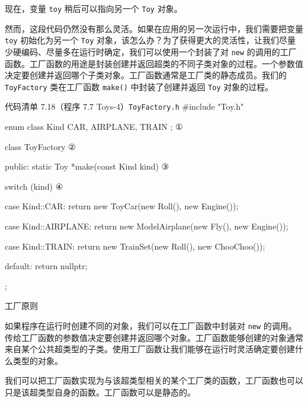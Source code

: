 现在，变量 \texttt{toy} 稍后可以指向另一个 \texttt{Toy} 对象。

然而，这段代码仍然没有那么灵活。如果在应用的另一次运行中，我们需要把变量 \texttt{toy} 初始化为另一个 \texttt{Toy} 对象，该怎么办？为了获得更大的灵活性，让我们尽量少硬编码、尽量多在运行时确定，我们可以使用一个封装了对 \texttt{new} 的调用的工厂函数。工厂函数的用途是封装创建并返回超类的不同子类对象的过程。一个参数值决定要创建并返回哪个子类对象。工厂函数通常是工厂类的静态成员。我们的 \texttt{Toy\allowbreak{}Factory} 类在工厂函数 \texttt{make()} 中封装了创建并返回 \texttt{Toy} 对象的过程。

\begin{codeboxt}{代码清单 7.18（程序 7.7 Toys-4）\texttt{Toy\allowbreak{}Factory.\allowbreak{}h}}
#include "Toy.h"

enum class Kind { CAR, AIRPLANE, TRAIN };  ①

class ToyFactory                           ②
{
public:
    static Toy *make(const Kind kind)      ③
    {
        switch (kind)                      ④
        {
            case Kind::CAR:
                return new ToyCar(new Roll(), new Engine());

            case Kind::AIRPLANE:
                return new ModelAirplane(new Fly(), new Engine());

            case Kind::TRAIN:
                return new TrainSet(new Roll(), new ChooChoo());

            default: return nullptr;
        }
    }
};
\end{codeboxt}
\par
{}\par
{}\par
{}\par

\begin{mySidebar}{工厂原则}

如果程序在运行时创建不同的对象，我们可以在工厂函数中封装对 \texttt{new} 的调用。传给工厂函数的参数值决定要创建并返回哪个对象。工厂函数能够创建的对象通常来自某个公共超类型的子类。使用工厂函数让我们能够在运行时灵活确定要创建什么类型的对象。

我们可以把工厂函数实现为与该超类型相关的某个工厂类的函数，工厂函数也可以只是该超类型自身的函数。工厂函数可以是静态的。
\end{mySidebar}

